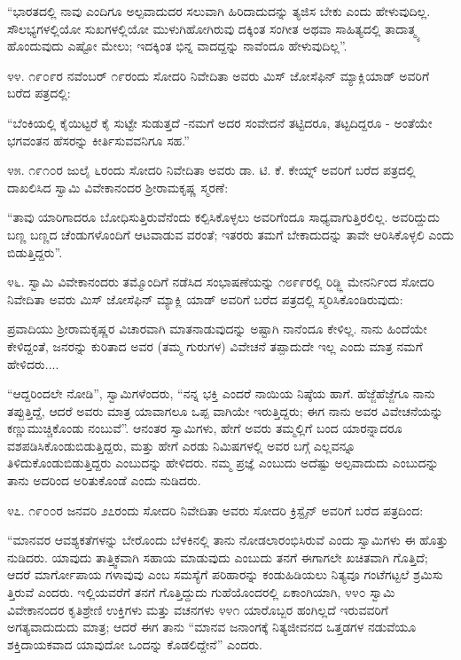“ಭಾರತದಲ್ಲಿ ನಾವು ಎಂದಿಗೂ ಅಲ್ಪವಾದುದರ ಸಲುವಾಗಿ ಹಿರಿದಾದುದನ್ನು ತ್ಯಜಿಸ ಬೇಕು ಎಂದು ಹೇಳುವುದಿಲ್ಲ. ಸೌಲಭ್ಯಗಳಲ್ಲಿಯೋ ಸುಖಗಳಲ್ಲಿಯೋ ಮುಳುಗಿಹೋಗಿರುವು ದಕ್ಕಿಂತ ಸಂಗೀತ ಅಥವಾ ಸಾಹಿತ್ಯದಲ್ಲಿ ತಾದಾತ್ಮ್ಯ ಹೊಂದುವುದು ಎಷ್ಟೋ ಮೇಲು; ಇದಕ್ಕಿಂತ ಭಿನ್ನ ವಾದದ್ದನ್ನು ನಾವೆಂದೂ ಹೇಳುವುದಿಲ್ಲ”. 

೪೪. ೧೯೦೯ರ ನವೆಂಬರ್ ೧೯ರಂದು ಸೋದರಿ ನಿವೇದಿತಾ ಅವರು ಮಿಸ್ ಜೋಸೆಫಿನ್ ಮ್ಯಾಕ್ಲಿಯಾಡ್ ಅವರಿಗೆ ಬರೆದ ಪತ್ರದಲ್ಲಿ:

“ಬೆಂಕಿಯಲ್ಲಿ ಕೈಯಿಟ್ಟರೆ ಕೈ ಸುಟ್ಟೇ ಸುಡುತ್ತದೆ -ನಮಗೆ ಅದರ ಸಂವೇದನೆ ತಟ್ಟಿದರೂ, ತಟ್ಟದಿದ್ದರೂ - ಅಂತೆಯೇ ಭಗವಂತನ ಹೆಸರನ್ನು ಕೀರ್ತಿಸುವವನಿಗೂ ಸಹ.” 

೪೫. ೧೯೧೦ರ ಜುಲೈ ೬ರಂದು ಸೋದರಿ ನಿವೇದಿತಾ ಅವರು ಡಾ. ಟಿ. ಕೆ. ಕೇಯ್ನ್ ಅವರಿಗೆ ಬರೆದ ಪತ್ರದಲ್ಲಿ ದಾಖಲಿಸಿದ ಸ್ವಾಮಿ ವಿವೇಕಾನಂದರ ಶ‍್ರೀರಾಮಕೃಷ್ಣ ಸ್ಮರಣೆ:

“ತಾವು ಯಾರಿಗಾದರೂ ಬೋಧಿಸುತ್ತಿರುವೆನೆಂದು ಕಲ್ಪಿಸಿಕೊಳ್ಳಲು ಅವರಿಗೆಂದೂ ಸಾಧ್ಯವಾಗುತ್ತಿರಲಿಲ್ಲ. ಅವರಿದ್ದುದು ಬಣ್ಣ ಬಣ್ಣದ ಚೆಂಡುಗಳೊಂದಿಗೆ ಆಟವಾಡುವ ವರಂತೆ; ಇತರರು ತಮಗೆ ಬೇಕಾದುದನ್ನು ತಾವೇ ಆರಿಸಿಕೊಳ್ಳಲಿ ಎಂದು ಬಿಡುತ್ತಿದ್ದರು”. 

೪೬. ಸ್ವಾಮಿ ವಿವೇಕಾನಂದರು ತಮ್ಮೊಂದಿಗೆ ನಡೆಸಿದ ಸಂಭಾಷಣೆಯನ್ನು ೧೮೯೯ರಲ್ಲಿ ರಿಡ್ಜ್ಲಿ ಮೇನರ್ನಿಂದ ಸೋದರಿ ನಿವೇದಿತಾ ಅವರು ಮಿಸ್ ಜೋಸೆಫಿನ್ ಮ್ಯಾಕ್ಲಿ ಯಾಡ್ ಅವರಿಗೆ ಬರೆದ ಪತ್ರದಲ್ಲಿ ಸ್ಮರಿಸಿಕೊಂಡಿರುವುದು:

ಪ್ರವಾದಿಯು ಶ‍್ರೀರಾಮಕೃಷ್ಣರ ವಿಚಾರವಾಗಿ ಮಾತನಾಡುವುದನ್ನು ಅಷ್ಟಾಗಿ ನಾನೆಂದೂ ಕೇಳಿಲ್ಲ. ನಾನು ಹಿಂದೆಯೇ ಕೇಳಿದ್ದಂತೆ, ಜನರನ್ನು ಕುರಿತಾದ ಅವರ (ತಮ್ಮ ಗುರುಗಳ) ವಿವೇಚನೆ ತಪ್ಪಾದುದೇ ಇಲ್ಲ ಎಂದು ಮಾತ್ರ ನಮಗೆ ಹೇಳಿದರು....

“ಆದ್ದರಿಂದಲೇ ನೋಡಿ”, ಸ್ವಾಮಿಗಳೆಂದರು, “ನನ್ನ ಭಕ್ತಿ ಎಂದರೆ ನಾಯಿಯ ನಿಷ್ಠೆಯ ಹಾಗೆ. ಹೆಜ್ಜೆಹೆಜ್ಜೆಗೂ ನಾನು ತಪ್ಪುತ್ತಿದ್ದೆ, ಆದರೆ ಅವರು ಮಾತ್ರ ಯಾವಾಗಲೂ ಒಪ್ಪ ವಾಗಿಯೇ ಇರುತ್ತಿದ್ದರು; ಈಗ ನಾನು ಅವರ ವಿವೇಚನೆಯನ್ನು ಕಣ್ಣುಮುಚ್ಚಿಕೊಂಡು ನಂಬುವೆ”. ಆನಂತರ ಸ್ವಾಮಿಗಳು, ಹೇಗೆ ಅವರು ತಮ್ಮಲ್ಲಿಗೆ ಬಂದ ಯಾರನ್ನಾದರೂ ವಶಪಡಿಸಿಕೊಂಡುಬಿಡುತ್ತಿದ್ದರು, ಮತ್ತು ಹೇಗೆ ಎರಡು ನಿಮಿಷಗಳಲ್ಲಿ ಅವರ ಬಗ್ಗೆ ಎಲ್ಲವನ್ನೂ ತಿಳಿದುಕೊಂಡುಬಿಡುತ್ತಿದ್ದರು ಎಂಬುದನ್ನು ಹೇಳಿದರು. ನಮ್ಮ ಪ್ರಜ್ಞೆ ಎಂಬುದು ಅದೆಷ್ಟು ಅಲ್ಪವಾದುದು ಎಂಬುದನ್ನು ತಾನು ಅದರಿಂದ ಅರಿತುಕೊಂಡೆ ಎಂದು ನುಡಿದರು. 

೪೭. ೧೯೦೦ರ ಜನವರಿ ೨೭ರಂದು ಸೋದರಿ ನಿವೇದಿತಾ ಅವರು ಸೋದರಿ ಕ್ರಿಸ್ಟೈನ್ ಅವರಿಗೆ ಬರೆದ ಪತ್ರದಿಂದ:

“ಮಾನವರ ಆವಶ್ಯಕತೆಗಳನ್ನು ಬೇರೊಂದು ಬೆಳಕಿನಲ್ಲಿ ತಾನು ನೋಡಲಾರಂಭಿಸಿರುವೆ ಎಂದು ಸ್ವಾಮಿಗಳು ಈ ಹೊತ್ತು ನುಡಿದರು. ಯಾವುದು ತಾತ್ತ್ವಿಕವಾಗಿ ಸಹಾಯ ಮಾಡುವುದು ಎಂಬುದು ತನಗೆ ಈಗಾಗಲೇ ಖಚಿತವಾಗಿ ಗೊತ್ತಿದೆ; ಆದರೆ ಮಾರ್ಗೋಪಾಯ ಗಳಾವುವು ಎಂಬ ಸಮಸ್ಯೆಗೆ ಪರಿಹಾರನ್ನು ಕಂಡುಹಿಡಿಯಲು ನಿತ್ಯವೂ ಗಂಟೆಗಟ್ಟಲೆ ಶ್ರಮಿಸು ತ್ತಿರುವೆ ಎಂದರು. ಇಲ್ಲಿಯವರೆಗೆ ತನಗೆ ಗೊತ್ತಿದ್ದುದು ಗುಹೆಯೊಂದರಲ್ಲಿ ಏಕಾಂಗಿಯಾಗಿ, ೪೪೦ ಸ್ವಾಮಿ ವಿವೇಕಾನಂದರ ಕೃತಿಶ್ರೇಣಿ ಉಕ್ತಿಗಳು ಮತ್ತು ವಚನಗಳು ೪೪೧ ಯಾರೊಬ್ಬರ ಹಂಗಿಲ್ಲದೆ ಇರುವವರಿಗೆ ಅಗತ್ಯವಾದುದುದು ಮಾತ್ರ; ಆದರೆ ಈಗ ತಾನು “ಮಾನವ ಜನಾಂಗಕ್ಕೆ ನಿತ್ಯಜೀವನದ ಒತ್ತಡಗಳ ನಡುವೆಯೂ ಶಕ್ತಿದಾಯಕವಾದ ಯಾವುದೋ ಒಂದನ್ನು ಕೊಡಲಿದ್ದೇನೆ” ಎಂದರು. 

